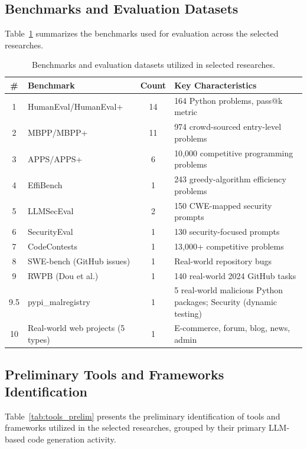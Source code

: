 \documentclass[11pt,a4paper]{article}
\begin{document}
\subsection{Benchmarks and Evaluation Datasets}
\label{sec:benchmarks_results}

Table~\ref{tab:benchmarks} summarizes the benchmarks used for evaluation across the selected researches.

\begin{table}[H]
\centering
\caption{Benchmarks and evaluation datasets utilized in selected researches.}
\label{tab:benchmarks}
\small
\begin{tabular}{@{}clcp{6cm}@{}}
\toprule
\textbf{\#} & \textbf{Benchmark} & \textbf{Count} & \textbf{Key Characteristics} \\
\midrule
1 & HumanEval/HumanEval+ & 14 & 164 Python problems, pass@k metric \\
2 & MBPP/MBPP+ & 11 & 974 crowd-sourced entry-level problems \\
3 & APPS/APPS+ & 6 & 10{,}000 competitive programming problems \\
4 & EffiBench & 1 & 243 greedy-algorithm efficiency problems \\
5 & LLMSecEval & 2 & 150 CWE-mapped security prompts \\
6 & SecurityEval & 1 & 130 security-focused prompts \\
7 & CodeContests & 1 & 13{,}000+ competitive problems \\
8 & SWE-bench (GitHub issues) & 1 & Real-world repository bugs \\
9 & RWPB (Dou et al.) & 1 & 140 real-world 2024 GitHub tasks \\
9.5 & pypi\_malregistry & 1 & 5 real-world malicious Python packages; Security (dynamic testing) \\
10 & Real-world web projects (5 types) & 1 & E-commerce, forum, blog, news, admin \\
\bottomrule
\end{tabular}
\end{table}

\subsection{Preliminary Tools and Frameworks Identification}
\label{sec:tools_prelim}

Table~\ref{tab:tools_prelim} presents the preliminary identification of tools and frameworks utilized in the selected researches, grouped by their primary LLM-based code generation activity.
\end{document}
